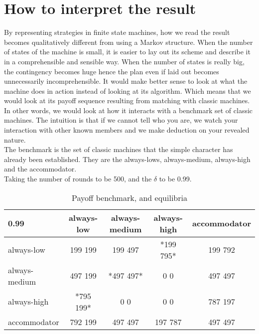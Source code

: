 \documentclass[12.5pt]{report}
\begin{document}
\section{How to interpret the result}

By representing strategies in finite state machines, how we read the result becomes qualitatively different from using a Markov structure. When the number of states of the machine is small, it is easier to lay out its scheme and describe it in a comprehensible and sensible way. When the number of states is really big, the contingency becomes huge hence the plan even if laid out becomes unnecessarily incomprehensible. It would make better sense to look at what the machine does in action instead of looking at its algorithm. Which means that we would look at its payoff sequence resulting from matching with classic machines. In other words, we would look at how it interacts with a benchmark set of classic machines. The intuition is that if we cannot tell who you are, we watch your interaction with other known members and we make deduction on your revealed nature.\\

The benchmark is the set of classic machines that the simple character has already been established. They are the always-lows, always-medium, always-high and the accommodator.\\

Taking the number of rounds to be 500, and the $\delta$ to be 0.99. 

\begin{table}[h!]
\center
\begin{tabular}{l|cccc}
\textbf{0.99}& always-low & always-medium & always-high & accommodator\\
\hline
always-low    & 199 199 & 199 497 & *199 795*  & 199 792 \\
always-medium & 497 199 & *497 497* & 0 0      & 497 497 \\
always-high   & *795 199* & 0 0     & 0 0      & 787 197 \\
accommodator  & 792 199 & 497 497 & 197 787  & 497 497 \\
\end{tabular}
\caption{Payoff benchmark, and equilibria}
\end{table}
\end{document}
